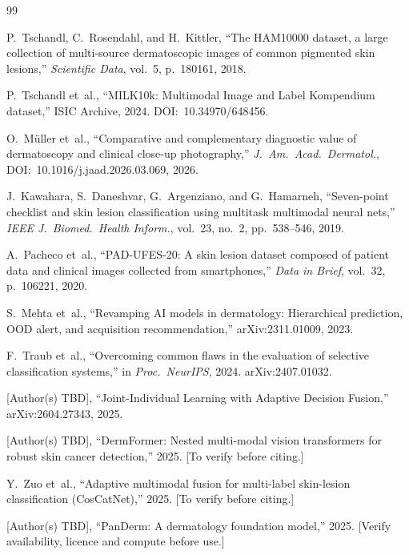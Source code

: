 \documentclass[conference]{IEEEtran}
\newcommand{\1}{\mathbf{1}}
\begin{document}

\begin{thebibliography}{99}

P.~Tschandl, C.~Rosendahl, and H.~Kittler,
``The HAM10000 dataset, a large collection of multi-source dermatoscopic
images of common pigmented skin lesions,''
\emph{Scientific Data}, vol.~5, p.~180161, 2018.

P.~Tschandl et~al.,
``MILK10k: Multimodal Image and Label Kompendium dataset,''
ISIC Archive, 2024. DOI:~10.34970/648456.

O.~M{\"u}ller et~al.,
``Comparative and complementary diagnostic value of dermatoscopy
and clinical close-up photography,''
\emph{J.\ Am.\ Acad.\ Dermatol.}, DOI:~10.1016/j.jaad.2026.03.069, 2026.

J.~Kawahara, S.~Daneshvar, G.~Argenziano, and G.~Hamarneh,
``Seven-point checklist and skin lesion classification using multitask
multimodal neural nets,''
\emph{IEEE J.\ Biomed.\ Health Inform.}, vol.~23, no.~2, pp.~538--546, 2019.

A.~Pacheco et~al.,
``PAD-UFES-20: A skin lesion dataset composed of patient data and
clinical images collected from smartphones,''
\emph{Data in Brief}, vol.~32, p.~106221, 2020.

S.~Mehta et~al.,
``Revamping AI models in dermatology: Hierarchical prediction, OOD alert,
and acquisition recommendation,''
arXiv:2311.01009, 2023.

F.~Traub et~al.,
``Overcoming common flaws in the evaluation of selective classification
systems,''
in \emph{Proc.\ NeurIPS}, 2024. arXiv:2407.01032.

[Author(s) TBD],
``Joint-Individual Learning with Adaptive Decision Fusion,''
arXiv:2604.27343, 2025.

[Author(s) TBD],
``DermFormer: Nested multi-modal vision transformers for robust skin
cancer detection,'' 2025. [To verify before citing.]

Y.~Zuo et~al.,
``Adaptive multimodal fusion for multi-label skin-lesion classification
(CosCatNet),'' 2025. [To verify before citing.]

[Author(s) TBD],
``PanDerm: A dermatology foundation model,'' 2025.
[Verify availability, licence and compute before use.]


\end{thebibliography}
\end{document}
